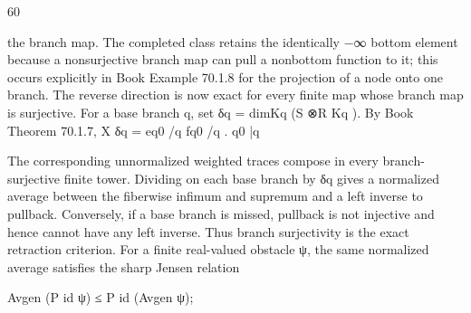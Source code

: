 \documentclass[11pt]{article}
\begin{document}
\begin{OriginalTaskDATA}
                                               60

the branch map. The completed class retains the identically −∞ bottom element because a
nonsurjective branch map can pull a nonbottom function to it; this occurs explicitly in Book
Example 70.1.8 for the projection of a node onto one branch.
   The reverse direction is now exact for every ﬁnite map whose branch map is surjective.
For a base branch q, set δq = dimKq (S ⊗R Kq ). By Book Theorem 70.1.7,
                                                  X
                                           δq =           eq0 /q fq0 /q .
                                                  q0 |q

The corresponding unnormalized weighted traces compose in every branch-surjective ﬁnite
tower. Dividing on each base branch by δq gives a normalized average between the ﬁberwise
inﬁmum and supremum and a left inverse to pullback. Conversely, if a base branch is missed,
pullback is not injective and hence cannot have any left inverse. Thus branch surjectivity is
the exact retraction criterion. For a ﬁnite real-valued obstacle ψ, the same normalized average
satisﬁes the sharp Jensen relation

                                    Avgen (P id ψ) ≤ P id (Avgen ψ);


\end{OriginalTaskDATA}
\end{document}
